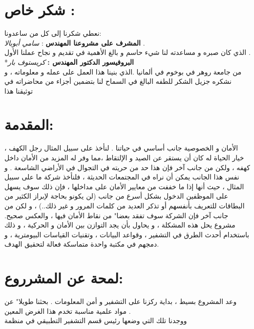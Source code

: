 \documentclass[11pt,a4paper]{report}
\begin{document}
\begin{otherlanguage}{arabic}
\chapter{شكر خاص :}
\begin{otherlanguage}{arabic}
\begin{center}
نعطي شكرنا إلى كل من ساعدونا:
\\
\textbf{المشرف على مشروعنا المهندس} :\textit{ سامي أبوبالا} .
\\
الذي كان صبره و مساعدته لنا شيء حاسم  و بالغ الأهمية في تقديم و نجاح عملنا الأول .
\\
*\textbf{البروفيسور الدكتور المهندس :} 
\textit{كريستوف بار}
\\
من جامعة روهر في بوخوم  في ألمانيا  .الذي بنينا هذا العمل على عمله و معلوماته ، و نشكره  جزيل الشكر للطفه  البالغ في السماح لنا بتضمين أجزاء من محاضراته في توثيقنا هذا 
\end{center}
\end{otherlanguage}


\chapter{المقدمة:}
\begin{otherlanguage}{arabic}
\begin{center}
الأمان و الخصوصية جانب أساسي في حياتنا .
لنأخذ على سبيل المثال رجل الكهف ، خيار الحياة له كان أن يستقر عن الصيد و الإلتقاط ،مما وفر له المزيد من الأمان داخل كهفه ، ولكن من جانب آخر فإن هذا حد من حريته في التجوال في الأراضي الشاسعة . 
\newline
و نفس هذا الجانب يمكن أن نراه في المجتمعات الحديثة ، فلنأخذ شركة ما على سبيل المثال ، حيث أنها إذا ما خففت من معايير الأمان على مداخلها ، فإن ذلك سوف يسهل على الموظفين الدخول بشكل أسرع من جانب (لن يكونو بحاجة لإبراز الكثير من البطاقات للتعريف بأنفسهم أو تذكر العديد من كلمات المرور و غير ذلك..) ، 
\newline
و لكن من جانب آخر فإن الشركة سوف تفقد بعضا" من نقاط الأمان فيها ، والعكس صحيح.
\newline
مشروع  \textit{} يحل هذه المشكلة ، و يحاول بأن يجد التوازن بين الأمان و الحركية ، و ذلك باستخدام أحدث الطرق في التشفير ، وقواعد البيانات ، وتقنيات القياسات البيومترية ،
و دمجهم في مكتبة واحدة متماسكة فعالة لتحقيق الهدف.
\end{center}
\end{otherlanguage}

\chapter{لمحة عن المشرروع:}
\begin{otherlanguage}{arabic}
\begin{center}
وعد المشروع بسيط ، بداية ركزنا على التشفير و أمن المعلومات .
\newline
بحثنا طويلا" عن مواد علمية  مناسبة  تخدم هذا الغرض المعين .
\\
ووجدنا تلك التي وضعها رئيس قسم التشفير التطبيقي في منظمة 
\\
\textit{ }


\end{center}
\end{otherlanguage}
\end{otherlanguage}
\end{document}
